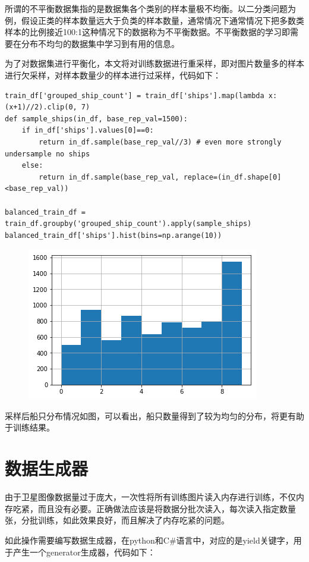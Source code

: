 所谓的不平衡数据集指的是数据集各个类别的样本量极不均衡。以二分类问题为例，假设正类的样本数量远大于负类的样本数量，通常情况下通常情况下把多数类样本的比例接近100:1这种情况下的数据称为不平衡数据。不平衡数据的学习即需要在分布不均匀的数据集中学习到有用的信息。

为了对数据集进行平衡化，本文将对训练数据进行重采样，即对图片数量多的样本进行欠采样，对样本数量少的样本进行过采样，代码如下：

\begin{verbatim}
train_df['grouped_ship_count'] = train_df['ships'].map(lambda x: (x+1)//2).clip(0, 7)
def sample_ships(in_df, base_rep_val=1500):
    if in_df['ships'].values[0]==0:
        return in_df.sample(base_rep_val//3) # even more strongly undersample no ships
    else:
        return in_df.sample(base_rep_val, replace=(in_df.shape[0]<base_rep_val))
    
balanced_train_df = train_df.groupby('grouped_ship_count').apply(sample_ships)
balanced_train_df['ships'].hist(bins=np.arange(10))
\end{verbatim}

\begin{figure}
\centering
\includegraphics{preprocessing_pic/5.png}
\caption{}
\end{figure}

采样后船只分布情况如图，可以看出，船只数量得到了较为均匀的分布，将更有助于训练结果。

\section{数据生成器}

由于卫星图像数据量过于庞大，一次性将所有训练图片读入内存进行训练，不仅内存吃紧，而且没有必要。正确做法应该是将数据分批次读入，每次读入指定数量张，分批训练，如此效果良好，而且解决了内存吃紧的问题。

如此操作需要编写数据生成器，在python和C\#语言中，对应的是yield关键字，用于产生一个generator生成器，代码如下：


